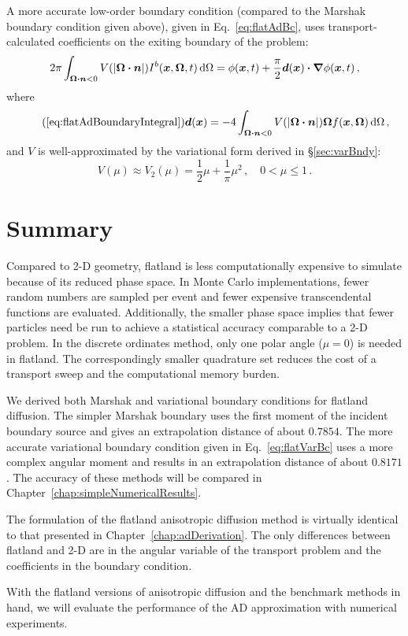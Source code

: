 A more accurate low-order boundary condition (compared to the Marshak
boundary condition given above), given in Eq.~\eqref{eq:flatAdBc}, uses
transport-calculated coefficients on the exiting boundary of the problem:
\begin{equation*}
2\pi \int_{\bm{\Omega}\bm{\cdot}\bm{n} < 0} V( \left| \bm{\Omega}\bm{\cdot}\bm{n} \right|)
I^b(\bm{x}, \bm{\Omega},t) \mathop{}\!\mathrm{d}\Omega
=
\phi(\bm{x},t)
+ \frac{\pi}{2} \bm{d}(\bm{x}) \bm{\cdot} \bm{\nabla} \phi(\bm{x},t)\,,
\end{equation*}
where
\begin{equation}\tag{\ref{eq:flatAdBoundaryIntegral}}
  \vec{d}(\vec{x}) = -4\int_{\vec{\Omega}\vd\vec{n} < 0}
  V(\abs{\vec{\Omega}\vd\vec{n}})
\vec{\Omega} f(\vec{x}, \vec{\Omega}) \ud\Omega\,,
\end{equation}
and $V$ is well-approximated by the variational form derived in
\S\ref{sec:varBndy}:
\begin{equation*}
  V(\mu) \approx V_2(\mu) =  \frac{1}{2} \mu + \frac{1}{\pi}\mu^2 \,,
  \quad 0 < \mu \le 1 \,.
\end{equation*}

\section{Summary}
Compared to 2-D geometry, flatland is less computationally expensive to
simulate because of its reduced phase space. In Monte Carlo
implementations, fewer random numbers are sampled per event and fewer expensive
transcendental functions are evaluated. Additionally, the smaller phase space
implies that fewer particles need be run to achieve a statistical
accuracy comparable to a 2-D problem. In the discrete ordinates method, only
one polar angle ($\mu=0$) is needed in flatland. The correspondingly smaller
quadrature set reduces
the cost of a transport sweep and the computational memory burden.

We derived both Marshak and variational boundary conditions for flatland
diffusion. The simpler Marshak boundary uses
the first moment of the incident boundary source and gives an extrapolation
distance of about $0.7854$.
The more accurate variational boundary condition given in
Eq.~\eqref{eq:flatVarBc} uses a more complex angular moment and results in
an extrapolation
distance of about $0.8171$. The accuracy of these methods will be compared in
Chapter~\ref{chap:simpleNumericalResults}.

The formulation of the flatland anisotropic diffusion method is virtually
identical to
that presented in Chapter~\ref{chap:adDerivation}. The only differences between
flatland and 2-D are in the angular variable of the transport problem and the
coefficients in the boundary condition.

With the flatland versions of anisotropic diffusion and the benchmark methods in
hand, we will evaluate the performance of the AD approximation with numerical
experiments.

